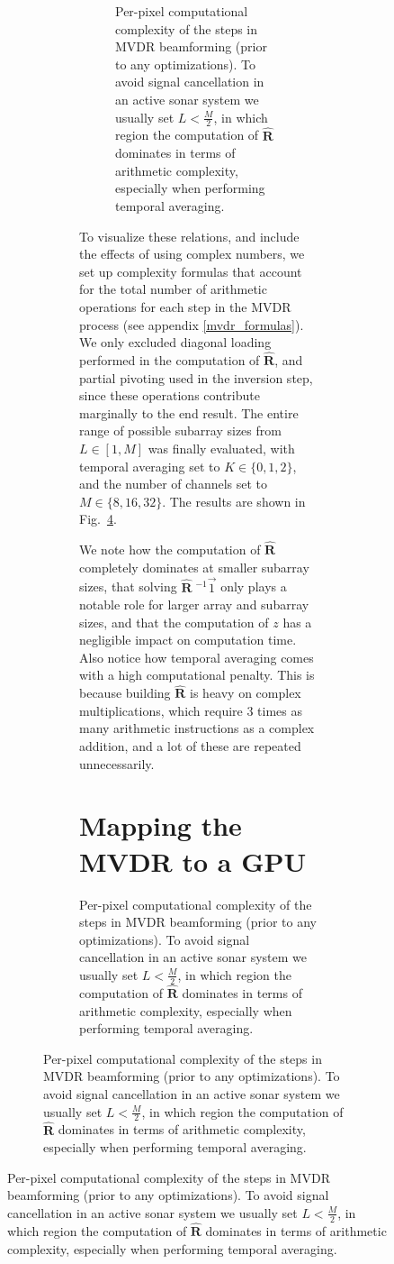 \documentclass[12pt,journal,draftclsnofoot,onecolumn]{IEEEtran}
\let\MYoriglatexcaption\caption               %
\renewcommand{\caption}[2][\relax]{\MYoriglatexcaption[#2]{#2}}
\newcommand\Fig[1]{Fig.~\ref{#1}}
\newcommand\mat[1]{\boldsymbol{#1}}
\newcommand\1{\vec 1}
\newcommand*\eR{\mat{\hat R}}
\newcommand*\eRi{\hat{\mat R}\;\!^{-1}}
\begin{document}
\begin{figure}[H]
\begin{figure}[!t]
\begin{figure}[!t]
\begin{figure}[!t]
\fi%
\caption{Per-pixel computational complexity of the steps in MVDR beamforming (prior to any optimizations). To avoid signal cancellation in an active sonar system we usually set $L<\frac{M}{2}$, in which region the computation of $\eR$ dominates in terms of arithmetic complexity, especially when performing temporal averaging.}\label{mvdr_complexity}
\end{figure}
To visualize these relations, and include the effects of using complex numbers, we set up complexity formulas that account for the total number of arithmetic operations for each step in the MVDR process (see appendix \ref{mvdr_formulas}). We only excluded diagonal loading performed in the computation of $\eR$, and partial pivoting used in the inversion step, since these operations contribute marginally to the end result. The entire range of possible subarray sizes from $L\in[1,M]$ was finally evaluated, with temporal averaging set to $K\in\{0,1,2\}$, and the number of channels set to $M\in\{8,16,32\}$. The results are shown in \Fig{mvdr_complexity}.

We note how the computation of $\eR$ completely dominates at smaller subarray sizes, that solving $\eRi\1$ only plays a notable role for larger array and subarray sizes, and that the computation of $z$ has a negligible impact on computation time. Also notice how temporal averaging comes with a high computational penalty. This is because building $\eR$ is heavy on complex multiplications, which require 3 times as many arithmetic instructions as a complex addition, and a lot of these are repeated unnecessarily.








\section{Mapping the MVDR to a GPU}\label{maptogpu}



\end{figure}
\end{figure}
\end{figure}
\end{document}
